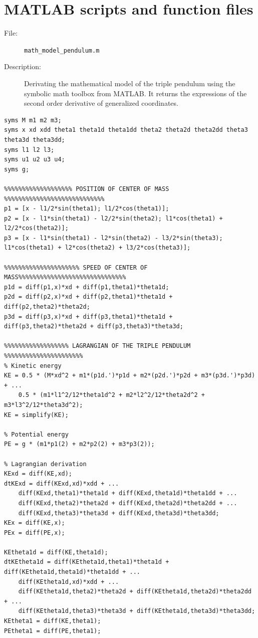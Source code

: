 \documentclass[a4paper,12pt]{article}
\begin{document}
\section{MATLAB scripts and function files}
\begin{description}
	\item[File:] \texttt{math\_model\_pendulum.m}
	\item[Description:] Derivating the mathematical model of the triple pendulum using the symbolic math toolbox from MATLAB. It returns the expressions of the second order derivative of generalized coordinates.
\end{description}
\begin{lstlisting}[label=code:mathmodelpendulum,caption=\texttt{math\_model\_pendulum.m}]
syms M m1 m2 m3;
syms x xd xdd theta1 theta1d theta1dd theta2 theta2d theta2dd theta3 theta3d theta3dd;
syms l1 l2 l3;
syms u1 u2 u3 u4;
syms g;

%%%%%%%%%%%%%%%%%%% POSITION OF CENTER OF MASS %%%%%%%%%%%%%%%%%%%%%%%%%%%%
p1 = [x - l1/2*sin(theta1); l1/2*cos(theta1)];
p2 = [x - l1*sin(theta1) - l2/2*sin(theta2); l1*cos(theta1) + l2/2*cos(theta2)];
p3 = [x - l1*sin(theta1) - l2*sin(theta2) - l3/2*sin(theta3); l1*cos(theta1) + l2*cos(theta2) + l3/2*cos(theta3)];

%%%%%%%%%%%%%%%%%%%%% SPEED OF CENTER OF MASS%%%%%%%%%%%%%%%%%%%%%%%%%%%%%%
p1d = diff(p1,x)*xd + diff(p1,theta1)*theta1d;
p2d = diff(p2,x)*xd + diff(p2,theta1)*theta1d + diff(p2,theta2)*theta2d;
p3d = diff(p3,x)*xd + diff(p3,theta1)*theta1d + diff(p3,theta2)*theta2d + diff(p3,theta3)*theta3d;

%%%%%%%%%%%%%%%%%% LAGRANGIAN OF THE TRIPLE PENDULUM %%%%%%%%%%%%%%%%%%%%%%
% Kinetic energy
KE = 0.5 * (M*xd^2 + m1*(p1d.')*p1d + m2*(p2d.')*p2d + m3*(p3d.')*p3d) + ...
    0.5 * (m1*l1^2/12*theta1d^2 + m2*l2^2/12*theta2d^2 + m3*l3^2/12*theta3d^2);
KE = simplify(KE);

% Potential energy
PE = g * (m1*p1(2) + m2*p2(2) + m3*p3(2));

% Lagrangian derivation
KExd = diff(KE,xd);
dtKExd = diff(KExd,xd)*xdd + ...
	diff(KExd,theta1)*theta1d + diff(KExd,theta1d)*theta1dd + ...
	diff(KExd,theta2)*theta2d + diff(KExd,theta2d)*theta2dd + ...
	diff(KExd,theta3)*theta3d + diff(KExd,theta3d)*theta3dd;
KEx = diff(KE,x);
PEx = diff(PE,x);

KEtheta1d = diff(KE,theta1d);
dtKEtheta1d = diff(KEtheta1d,theta1)*theta1d + diff(KEtheta1d,theta1d)*theta1dd + ...
	diff(KEtheta1d,xd)*xdd + ...
	diff(KEtheta1d,theta2)*theta2d + diff(KEtheta1d,theta2d)*theta2dd + ...
	diff(KEtheta1d,theta3)*theta3d + diff(KEtheta1d,theta3d)*theta3dd;
KEtheta1 = diff(KE,theta1);
PEtheta1 = diff(PE,theta1);


\end{lstlisting}
\end{document}
